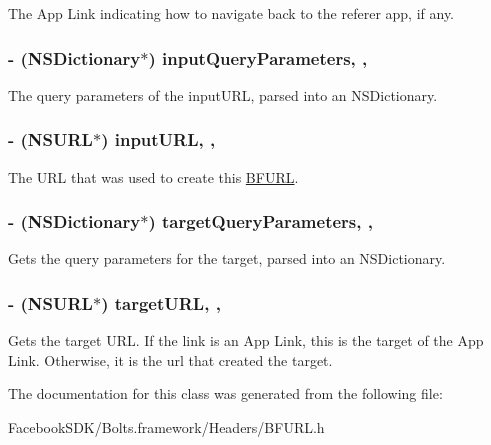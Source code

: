 The App Link indicating how to navigate back to the referer app, if any. \hypertarget{interface_b_f_u_r_l_a03a744a57286fa44530dcfc5528fa49d}{
\subsubsection[{input\-Query\-Parameters}]{\setlength{\rightskip}{0pt plus 5cm}-\/ (N\-S\-Dictionary$\ast$) input\-Query\-Parameters\hspace{0.3cm}{\ttfamily [read]}, {\ttfamily [nonatomic]}, {\ttfamily [strong]}}}\label{interface_b_f_u_r_l_a03a744a57286fa44530dcfc5528fa49d}
The query parameters of the input\-U\-R\-L, parsed into an N\-S\-Dictionary. \hypertarget{interface_b_f_u_r_l_a588a05e6eaedf5f9b17ce0f85edbef20}{
\subsubsection[{input\-U\-R\-L}]{\setlength{\rightskip}{0pt plus 5cm}-\/ (N\-S\-U\-R\-L$\ast$) input\-U\-R\-L\hspace{0.3cm}{\ttfamily [read]}, {\ttfamily [nonatomic]}, {\ttfamily [strong]}}}\label{interface_b_f_u_r_l_a588a05e6eaedf5f9b17ce0f85edbef20}
The U\-R\-L that was used to create this \hyperlink{interface_b_f_u_r_l}{B\-F\-U\-R\-L}. \hypertarget{interface_b_f_u_r_l_a874bc9b6e197567616676e7c35882312}{
\subsubsection[{target\-Query\-Parameters}]{\setlength{\rightskip}{0pt plus 5cm}-\/ (N\-S\-Dictionary$\ast$) target\-Query\-Parameters\hspace{0.3cm}{\ttfamily [read]}, {\ttfamily [nonatomic]}, {\ttfamily [strong]}}}\label{interface_b_f_u_r_l_a874bc9b6e197567616676e7c35882312}
Gets the query parameters for the target, parsed into an N\-S\-Dictionary. \hypertarget{interface_b_f_u_r_l_aa83698fb8e97cde89f07f2a27dd453b9}{
\subsubsection[{target\-U\-R\-L}]{\setlength{\rightskip}{0pt plus 5cm}-\/ (N\-S\-U\-R\-L$\ast$) target\-U\-R\-L\hspace{0.3cm}{\ttfamily [read]}, {\ttfamily [nonatomic]}, {\ttfamily [strong]}}}\label{interface_b_f_u_r_l_aa83698fb8e97cde89f07f2a27dd453b9}
Gets the target U\-R\-L. If the link is an App Link, this is the target of the App Link. Otherwise, it is the url that created the target. 

The documentation for this class was generated from the following file\-:\begin{DoxyCompactItemize}
\item 
Facebook\-S\-D\-K/\-Bolts.\-framework/\-Headers/B\-F\-U\-R\-L.\-h\end{DoxyCompactItemize}
